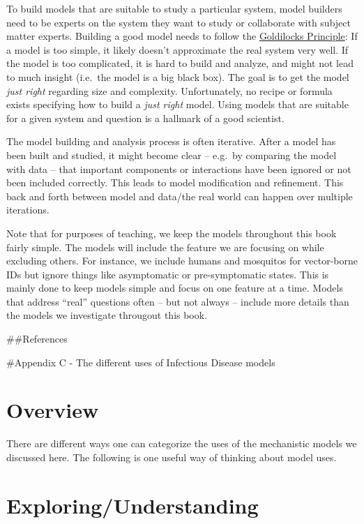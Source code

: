 \documentclass[]{book}
\theoremstyle{definition}
\theoremstyle{definition}
\theoremstyle{definition}
\theoremstyle{remark}
\begin{document}
To build models that are suitable to study a particular system, model
builders need to be experts on the system they want to study or
collaborate with subject matter experts. Building a good model needs to
follow the
\href{https://en.wikipedia.org/wiki/Goldilocks_principle}{Goldilocks
Principle}: If a model is too simple, it likely doesn't approximate the
real system very well. If the model is too complicated, it is hard to
build and analyze, and might not lead to much insight (i.e.~the model is
a big black box). The goal is to get the model \emph{just right}
regarding size and complexity. Unfortunately, no recipe or formula
exists specifying how to build a \emph{just right} model. Using models
that are suitable for a given system and question is a hallmark of a
good scientist.

The model building and analysis process is often iterative. After a
model has been built and studied, it might become clear -- e.g.~by
comparing the model with data -- that important components or
interactions have been ignored or not been included correctly. This
leads to model modification and refinement. This back and forth between
model and data/the real world can happen over multiple iterations.

Note that for purposes of teaching, we keep the models throughout this
book fairly simple. The models will include the feature we are focusing
on while excluding others. For instance, we include humans and mosquitos
for vector-borne IDs but ignore things like asymptomatic or
pre-symptomatic states. This is mainly done to keep models simple and
focus on one feature at a time. Models that address ``real'' questions
often -- but not always -- include more details than the models we
investigate througout this book.

\#\#References

\#Appendix C - The different uses of Infectious Disease models

\hypertarget{overview-1}{%
\section{Overview}\label{overview-1}}

There are different ways one can categorize the uses of the mechanistic
models we discussed here. The following is one useful way of thinking
about model uses.

\hypertarget{exploringunderstanding}{%
\section{Exploring/Understanding}\label{exploringunderstanding}}
\end{document}
